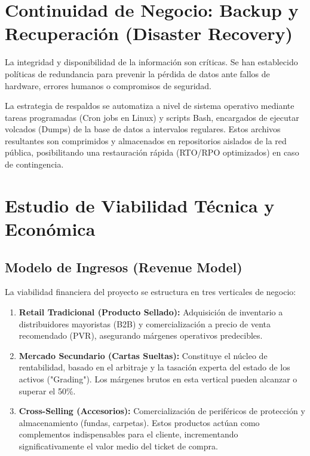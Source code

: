 \documentclass[12pt,a4paper]{article}
\begin{document}
\newpage
\section{Continuidad de Negocio: Backup y Recuperación (Disaster Recovery)}
\label{Backup}

La integridad y disponibilidad de la información son críticas. Se han establecido políticas de redundancia para prevenir la pérdida de datos ante fallos de hardware, errores humanos o compromisos de seguridad.

La estrategia de respaldos se automatiza a nivel de sistema operativo mediante tareas programadas (Cron jobs en Linux) y scripts Bash, encargados de ejecutar volcados (Dumps) de la base de datos a intervalos regulares. Estos archivos resultantes son comprimidos y almacenados en repositorios aislados de la red pública, posibilitando una restauración rápida (RTO/RPO optimizados) en caso de contingencia.

\newpage

\section{Estudio de Viabilidad Técnica y Económica}
\label{PlanNegocio}

\subsection{Modelo de Ingresos (Revenue Model)}
La viabilidad financiera del proyecto se estructura en tres verticales de negocio:

\begin{enumerate}
    \item \textbf{Retail Tradicional (Producto Sellado):} Adquisición de inventario a distribuidores mayoristas (B2B) y comercialización a precio de venta recomendado (PVR), asegurando márgenes operativos predecibles.
    \item \textbf{Mercado Secundario (Cartas Sueltas):} Constituye el núcleo de rentabilidad, basado en el arbitraje y la tasación experta del estado de los activos ("Grading"). Los márgenes brutos en esta vertical pueden alcanzar o superar el 50\%.
    \item \textbf{Cross-Selling (Accesorios):} Comercialización de periféricos de protección y almacenamiento (fundas, carpetas). Estos productos actúan como complementos indispensables para el cliente, incrementando significativamente el valor medio del ticket de compra.
\end{enumerate}
\end{document}

